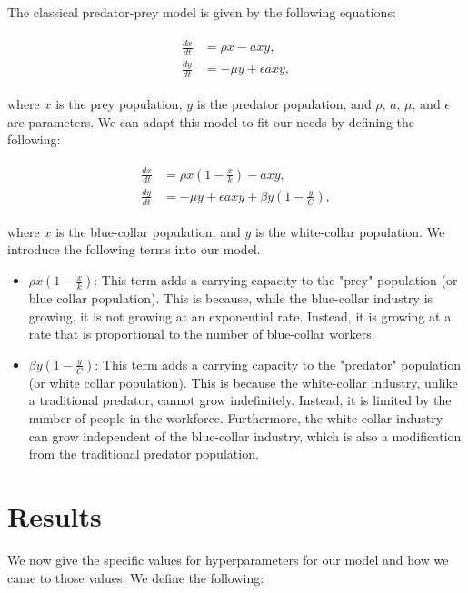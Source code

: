 \documentclass[11pt]{amsart}
\begin{document}
The classical predator-prey model is given by the following equations:

\begin{align}
    \begin{split}
        \frac{dx}{dt} &= \rho x - a x y, \\
        \frac{dy}{dt} &= -\mu y + \epsilon a x y,
    \end{split}
\end{align}

where $x$ is the prey population, $y$ is the predator population, and $\rho$, $a$, $\mu$, and $\epsilon$ are parameters. We can adapt this model to fit our needs by defining the following:

\begin{align}
    \begin{split}
        \frac{dx}{dt} &= \rho x (1-\frac{x}{k}) - a x y, \\
        \frac{dy}{dt} &= -\mu y + \epsilon a x y + \beta y (1-\frac{y}{C}),
    \end{split}
\end{align}

where $x$ is the blue-collar population, and $y$ is the white-collar population. We introduce the following terms into our model.
\begin{itemize}
    \item $\rho x (1-\frac{x}{k})$: This term adds a carrying capacity to the "prey" population (or blue collar population). This is because, while the blue-collar industry is growing, it is not growing at an exponential rate. Instead, it is growing at a rate that is proportional to the number of blue-collar workers.
    \item $\beta y (1-\frac{y}{C})$: This term adds a carrying capacity to the "predator" population (or white collar population). This is because the white-collar industry, unlike a traditional predator, cannot grow indefinitely. Instead, it is limited by the number of people in the workforce. Furthermore, the white-collar industry can grow independent of the blue-collar industry, which is also a modification from the traditional predator population.
\end{itemize}


\section{Results}

We now give the specific values for hyperparameters for our model and how we came to those values. We define the following:
\end{document}
